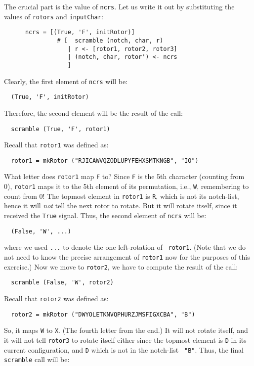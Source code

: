 \begin{Answer}
  The crucial part is the value of {\tt ncrs}. Let us write it out by
  substituting the values of {\tt rotors} and {\tt inputChar}:
\begin{Verbatim}
      ncrs = [(True, 'F', initRotor)]
               # [  scramble (notch, char, r)
                  | r <- [rotor1, rotor2, rotor3]
                  | (notch, char, rotor') <- ncrs
                  ]
\end{Verbatim}
Clearly, the first element of {\tt ncrs} will be:
\begin{Verbatim}
  (True, 'F', initRotor)
\end{Verbatim}
Therefore, the second element will be the result of the call:
\begin{Verbatim}
  scramble (True, 'F', rotor1)
\end{Verbatim}
Recall that {\tt rotor1} was defined as:
\begin{Verbatim}
  rotor1 = mkRotor ("RJICAWVQZODLUPYFEHXSMTKNGB", "IO")
\end{Verbatim}
What letter does {\tt rotor1} map {\tt F} to? Since {\tt F} is the 5th
character (counting from 0), {\tt rotor1} maps it to the 5th element
of its permutation, i.e., {\tt W}, remembering to count from 0!  The
topmost element in {\tt rotor1} is {\tt R}, which is not its
notch-list, hence it will {\em not} tell the next rotor to rotate. But
it will rotate itself, since it received the {\tt True} signal. Thus,
the second element of {\tt ncrs} will be:
\begin{Verbatim}
  (False, 'W', ...)
\end{Verbatim}
where we used {\tt ...} to denote the one left-rotation of {\tt
  rotor1}. (Note that we do not need to know the precise arrangement
of {\tt rotor1} now for the purposes of this exercise.) Now we move to
{\tt rotor2}, we have to compute the result of the call:
\begin{Verbatim}
  scramble (False, 'W', rotor2)
\end{Verbatim}
Recall that {\tt rotor2} was defined as:
\begin{Verbatim}
  rotor2 = mkRotor ("DWYOLETKNVQPHURZJMSFIGXCBA", "B")
\end{Verbatim}
So, it maps {\tt W} to {\tt X}. (The fourth letter from the end.)  It
will not rotate itself, and it will not tell {\tt rotor3} to rotate
itself either since the topmost element is {\tt D} in its current
configuration, and {\tt D} which is not in the notch-list {\tt
  "B"}. Thus, the final {\tt scramble} call will be:

\end{Answer}
